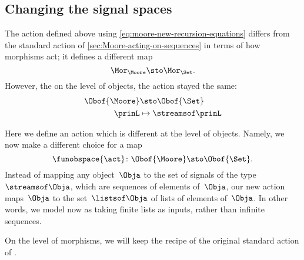 
\subsection{Changing the signal spaces}

The action defined above using \cref{eq:moore-new-recursion-equations} differs from the standard action of \cref{sec:Moore-acting-on-sequences} in terms of how morphisms act; it defines a different map
\begin{equation}
    \Mor_\Moore \sto \Mor_\Set.
\end{equation}
However, the on the level of objects, the action stayed the same:
\begin{equation}
    \begin{aligned}
        \Obof{\Moore} & \sto \Obof{\Set} \\
        \prinL        & \mapsto \streamsof\prinL
    \end{aligned}
\end{equation}

Here we define an action which is different at the level of objects.
Namely, we now make a different choice for a map
\begin{equation}
    \funobspace{\act} \colon \Obof{\Moore} \sto \Obof{\Set}.
\end{equation}
Instead of mapping any object~$\Obja$ to the set of signals of the type~$\streamsof\Obja$, which are sequences of elements of~$\Obja$, our new action maps~$\Obja$ to the set~$\listsof\Obja$ of lists of elements of~$\Obja$.
In other words, we model  now as taking finite lists as inputs, rather than infinite sequences.

On the level of morphisms, we will keep the recipe of the original standard action of .

